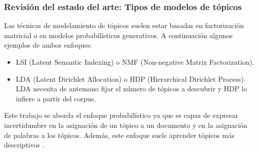 \documentclass[
	spanish, %
	aspectratio=43, %
	hyperref={pdfencoding=auto,psdextra},
	xcolor={dvipsnames,table,usenames}
]{beamer}
\begin{document}
\begin{frame}
\frametitle{Revisión del estado del arte: Tipos de modelos de tópicos}
Las técnicas de modelamiento de tópicos suelen estar basadas en factorización matricial o en modelos probabilísticos generativos. A continuación algunos ejemplos de ambos enfoques:

\begin{itemize}
  \item LSI (Latent Semantic Indexing) \cite{dumais2004latent} o NMF (Non-negative Matrix Factorization)\cite{xu2003document}. 
  \item LDA (Latent Dirichlet Allocation)\cite{blei2003latent} o HDP (Hierarchical Dirichlet Process)\cite{teh2005sharing}. LDA necesita de antemano fijar el número de tópicos a descubrir y HDP lo infiere a partir del corpus.
\end{itemize} 

Este trabajo se aborda el enfoque probabilístico ya que es capaz de expresar incertidumbre en la asignación de un tópico a un documento y en la asignación de palabras a los tópicos. Además, este enfoque suele aprender tópicos más descriptivos \cite{stevens2012exploring}.\\


\end{frame}
\end{document}
